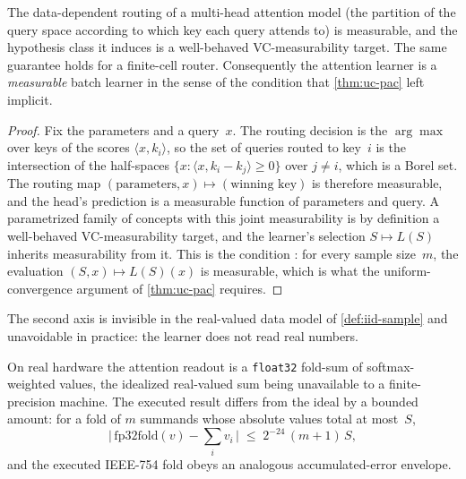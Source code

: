 \begin{prop}
\label{prop:attention-measurable-routing}
The data-dependent routing of a multi-head attention model (the partition of the query space according to which key each query attends to) is measurable, and the hypothesis class it induces is a well-behaved VC-measurability target.  The same guarantee holds for a finite-cell router.  Consequently the attention learner is a \emph{measurable} batch learner in the sense of the condition  that \cref{thm:uc-pac} left implicit.
\end{prop}

\begin{proof}
Fix the parameters and a query~$x$.  The routing decision is the $\arg\max$ over keys of the scores $\langle x, k_i\rangle$, so the set of queries routed to key~$i$ is the intersection of the half-spaces $\{x : \langle x, k_i - k_j\rangle \geq 0\}$ over $j \neq i$, which is a Borel set.  The routing map $(\text{parameters}, x) \mapsto (\text{winning key})$ is therefore measurable, and the head's prediction is a measurable function of parameters and query.  A parametrized family of concepts with this joint measurability is by definition a well-behaved VC-measurability target, and the learner's selection $S \mapsto L(S)$ inherits measurability from it.  This is the condition : for every sample size~$m$, the evaluation $(S, x) \mapsto L(S)(x)$ is measurable, which is what the uniform-convergence argument of \cref{thm:uc-pac} requires.
\end{proof}

The second axis is invisible in the real-valued data model of \cref{def:iid-sample} and unavoidable in practice: the learner does not read real numbers.

\begin{prop}
\label{prop:attention-fp32}
On real hardware the attention readout is a \texttt{float32} fold-sum of softmax-weighted values, the idealized real-valued sum being unavailable to a finite-precision machine.  The executed result differs from the ideal by a bounded amount: for a fold of $m$ summands whose absolute values total at most~$S$,
\[
  \bigl|\,\mathrm{fp32fold}(v) - \textstyle\sum_i v_i\,\bigr| \;\leq\; 2^{-24}\,(m+1)\,S,
\]
and the executed IEEE-754 fold obeys an analogous accumulated-error envelope.
\end{prop}

